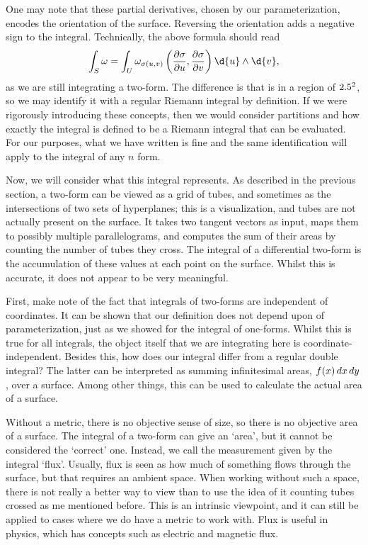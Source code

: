\documentclass[a4paper,12pt]{article}
\begin{document}
One may note that these partial derivatives, chosen by our parameterization, encodes the orientation of the surface.
Reversing the orientation adds a negative sign to the integral.
Technically, the above formula should read
\begin{equation*}
    \int_S \omega = \int_U \omega_{\sigma(u, v)}\left(\frac{\partial \sigma}{\partial u}, \frac{\partial \sigma}{\partial v}\right) \d{u} \wedge \d{v},
\end{equation*}
as we are still integrating a two-form.
The difference is that is in a region of $2.5^2$, so we may identify it with a regular Riemann integral by definition.
If we were rigorously introducing these concepts, then we would consider partitions and how exactly the integral is defined to be a Riemann integral that can be evaluated.
For our purposes, what we have written is fine and the same identification will apply to the integral of any $n$ form.

Now, we will consider what this integral represents.
As described in the previous section, a two-form can be viewed as a grid of tubes, and sometimes as the intersections of two sets of hyperplanes; this is a visualization, and tubes are not actually present on the surface.
It takes two tangent vectors as input, maps them to possibly multiple parallelograms, and computes the sum of their areas by counting the number of tubes they cross.
The integral of a differential two-form is the accumulation of these values at each point on the surface.
Whilst this is accurate, it does not appear to be very meaningful.

First, make note of the fact that integrals of two-forms are independent of coordinates.
It can be shown that our definition does not depend upon of parameterization, just as we showed for the integral of one-forms.
Whilst this is true for all integrals, the object itself that we are integrating here is coordinate-independent.
Besides this, how does our integral differ from a regular double integral?
The latter can be interpreted as summing infinitesimal areas, $f(x) \mathop{}\!d x \mathop{}\!d y$, over a surface.
Among other things, this can be used to calculate the actual area of a surface.

Without a metric, there is no objective sense of size, so there is no objective area of a surface.
The integral of a two-form can give an `area', but it cannot be considered the `correct' one.
Instead, we call the measurement given by the integral `flux'.
Usually, flux is seen as how much of something flows through the surface, but that requires an ambient space.
When working without such a space, there is not really a better way to view than to use the idea of it counting tubes crossed as me mentioned before.
This is an intrinsic viewpoint, and it can still be applied to cases where we do have a metric to work with.
Flux is useful in physics, which has concepts such as electric and magnetic flux.
\end{document}
